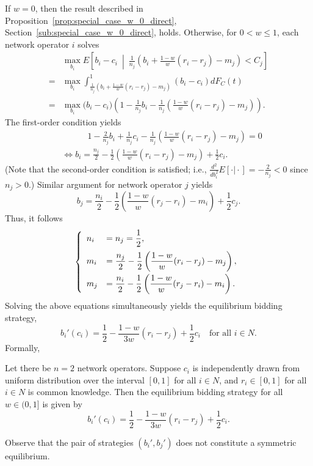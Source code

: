 If $w=0$, then the result described in Proposition~\ref{prop:special_case_w_0_direct}, Section~\ref{sub:special_case_w_0_direct}, holds. Otherwise, for $0<w\le 1$, each network operator $i$ solves
\begin{align}
	&\max_{b_i} E \left[ b_i-c_i \:\middle\vert\: \frac{1}{n_j}\left( b_i + \frac{1-w}{w}(r_i-r_j)-m_j \right) < C_j \right] \nonumber\\
	= &\max_{b_i}\int_{\frac{1}{n_j}(b_i + \frac{1-w}{w}(r_i-r_j)-m_j)}^{1} (b_i-c_i)dF_C(t)\nonumber\\
	= &\max_{b_i} \bigg(b_i-c_i\bigg) \left(1-\frac{1}{n_j}b_i-\frac{1}{n_j} \left(\frac{1-w}{w}(r_i-r_j)-m_j \right) \right).
	\label{eq:pcomp_exp_utility_w_1_direct}
\end{align}
The first-order condition yields
\begin{align}
	&\qquad\quad 1 - \frac{2}{n_j}b_i + \frac{1}{n_j}c_i - \frac{1}{n_j}\left( \frac{1-w}{w}(r_i-r_j) - m_j \right) = 0 \nonumber\\
	&\iff b_i = \frac{n_j}{2} - \frac{1}{2}\left( \frac{1-w}{w}(r_i-r_j) - m_j \right) + \frac{1}{2}c_i.
\end{align}
(Note that the second-order condition is satisfied; i.e., $\frac{d^2}{db^2_i}E[\cdot\vert\cdot] = -\frac{2}{n_j} < 0$ since $n_j>0$.) Similar argument for network operator $j$ yields
\begin{equation}
	b_j = \frac{n_i}{2} - \frac{1}{2}\left( \frac{1-w}{w}(r_j-r_i) - m_i \right) + \frac{1}{2}c_j.
\end{equation}
Thus, it follows
\begin{equation*}
	\left\{
	\begin{array}{l l}
		n_i &= n_j = \displaystyle\frac{1}{2},\\[2ex]
		m_i &= \displaystyle\frac{n_j}{2} - \displaystyle\frac{1}{2}\left( \displaystyle\frac{1-w}{w}(r_i-r_j) - m_j \right),\\[2ex]
		m_j &= \displaystyle\frac{n_i}{2} - \displaystyle\frac{1}{2}\left( \displaystyle\frac{1-w}{w}(r_j-r_i) - m_i \right).
	\end{array}\right.
\end{equation*}
Solving the above equations simultaneously yields the equilibrium bidding strategy,
\begin{equation*}
	b_i'(c_i) = \frac{1}{2} - \frac{1-w}{3w}(r_i-r_j) + \frac{1}{2}c_i \quad\text{for all } i\in N.
\end{equation*}
Formally,
\begin{proposition}
\label{prop:pcomp_equi_bidding_str_direct}
Let there be $n=2$ network operators. Suppose $c_i$ is independently drawn from uniform distribution over the interval $[0,1]$ for all $i\in N$, and $r_i\in [0,1]$ for all $i\in N$ is common knowledge. Then the equilibrium bidding strategy for all $w\in (0,1]$ is given by
\begin{equation}
	\label{eq:pcomp_equi_bidding_str_direct}
	b_i'(c_i) = \frac{1}{2} - \frac{1-w}{3w}(r_i-r_j) + \frac{1}{2}c_i.
\end{equation}
\end{proposition}
\noindent Observe that the pair of strategies $(b_i', b_j')$ does not constitute a symmetric equilibrium.

